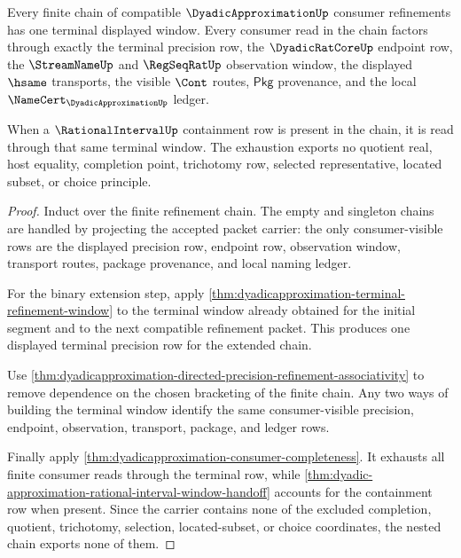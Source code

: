 \begin{theorem}
\label{thm:dyadicapproximation-nested-window-exhaustion}
Every finite chain of compatible $\DyadicApproximationUp$ consumer refinements
has one terminal displayed window. Every consumer read in the chain factors
through exactly the terminal precision row, the $\DyadicRatCoreUp$ endpoint
row, the $\StreamNameUp$ and $\RegSeqRatUp$ observation window, the displayed
$\hsame$ transports, the visible $\Cont$ routes, $\mathsf{Pkg}$ provenance,
and the local $\NameCert_{\DyadicApproximationUp}$ ledger.

When a $\RationalIntervalUp$ containment row is present in the chain, it is
read through that same terminal window. The exhaustion exports no quotient
real, host equality, completion point, trichotomy row, selected representative,
located subset, or choice principle.
\end{theorem}
\begin{proof}
Induct over the finite refinement chain. The empty and singleton chains are
handled by projecting the accepted packet carrier: the only consumer-visible
rows are the displayed precision row, endpoint row, observation window,
transport routes, package provenance, and local naming ledger.

For the binary extension step, apply
\autoref{thm:dyadicapproximation-terminal-refinement-window} to the terminal
window already obtained for the initial segment and to the next compatible
refinement packet. This produces one displayed terminal precision row for the
extended chain.

Use
\autoref{thm:dyadicapproximation-directed-precision-refinement-associativity}
to remove dependence on the chosen bracketing of the finite chain. Any two
ways of building the terminal window identify the same consumer-visible
precision, endpoint, observation, transport, package, and ledger rows.

Finally apply \autoref{thm:dyadicapproximation-consumer-completeness}. It
exhausts all finite consumer reads through the terminal row, while
\autoref{thm:dyadic-approximation-rational-interval-window-handoff} accounts
for the containment row when present. Since the carrier contains none of the
excluded completion, quotient, trichotomy, selection, located-subset, or choice
coordinates, the nested chain exports none of them.
\end{proof}


